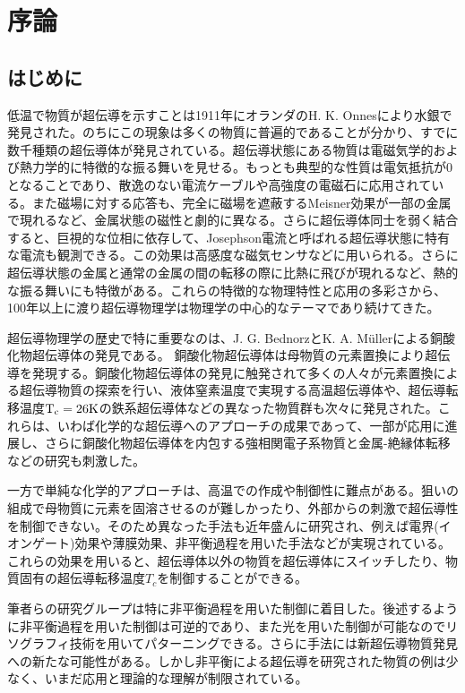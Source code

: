 \section{序論}
\subsection{はじめに}
低温で物質が超伝導を示すことは1911年にオランダのH. K. Onnesにより水銀で発見された。のちにこの現象は多くの物質に普遍的であることが分かり、すでに数千種類の超伝導体が発見されている。超伝導状態にある物質は電磁気学的および熱力学的に特徴的な振る舞いを見せる。もっとも典型的な性質は電気抵抗が0となることであり、散逸のない電流ケーブルや高強度の電磁石に応用されている。また磁場に対する応答も、完全に磁場を遮蔽するMeisner効果が一部の金属で現れるなど、金属状態の磁性と劇的に異なる。さらに超伝導体同士を弱く結合すると、巨視的な位相に依存して、Josephson電流と呼ばれる超伝導状態に特有な電流も観測できる。この効果は高感度な磁気センサなどに用いられる。さらに超伝導状態の金属と通常の金属の間の転移の際に比熱に飛びが現れるなど、熱的な振る舞いにも特徴がある。これらの特徴的な物理特性と応用の多彩さから、100年以上に渡り超伝導物理学は物理学の中心的なテーマであり続けてきた。

超伝導物理学の歴史で特に重要なのは、J. G. BednorzとK. A. M\"ullerによる銅酸化物超伝導体の発見である\cite{Bednorz}。
銅酸化物超伝導体は母物質の元素置換により超伝導を発現する\cite{Lee2006}。銅酸化物超伝導体の発見に触発されて多くの人々が元素置換による超伝導物質の探索を行い、液体窒素温度で実現する高温超伝導体\cite{Wu}や、超伝導転移温度$\rm T_c=26K$の鉄系超伝導体\cite{Kamihara}などの異なった物質群も次々に発見された。これらは、いわば化学的な超伝導へのアプローチの成果であって、一部が応用に進展し、さらに銅酸化物超伝導体を内包する強相関電子系物質と金属-絶縁体転移などの研究も刺激した\cite{Lee2006,Imada}。

一方で単純な化学的アプローチは、高温での作成や制御性に難点がある。狙いの組成で母物質に元素を固溶させるのが難しかったり、外部からの刺激で超伝導性を制御できない。そのため異なった手法も近年盛んに研究され、例えば電界(イオンゲート)効果\cite{Ueno,Ueno2,Ye2009}や薄膜効果\cite{Chiang1900}、非平衡過程\cite{Fausti,Hunt2015,Mitrano2016,oike}を用いた手法などが実現されている。これらの効果を用いると、超伝導体以外の物質を超伝導体にスイッチしたり、物質固有の超伝導転移温度$T_c$を制御することができる。

筆者らの研究グループは特に非平衡過程を用いた制御に着目した。後述するように非平衡過程を用いた制御は可逆的であり、また光を用いた制御が可能なのでリソグラフィ技術を用いてパターニングできる。さらに手法には新超伝導物質発見への新たな可能性がある。しかし非平衡による超伝導を研究された物質の例は少なく、いまだ応用と理論的な理解が制限されている。

